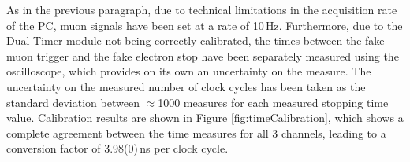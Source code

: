 \documentclass[../main.tex]{subfiles}
\begin{document}
As in the previous paragraph, due to technical limitations in the acquisition rate of the PC, muon signals have been set at a rate of 10\,Hz. Furthermore, due to the Dual Timer module not being correctly calibrated, the times between the fake muon trigger and the fake electron stop have been separately measured using the oscilloscope, which provides on its own an uncertainty on the measure. The uncertainty on the measured number of clock cycles has been taken as the standard deviation between $\approx$1000 measures for each measured stopping time value. Calibration results are shown in Figure \ref{fig:timeCalibration}, which shows a complete agreement between the time measures for all 3 channels, leading to a conversion factor of 3.98(0)\,ns per clock cycle.

\begin{figure}[htb!]%
 \centering
 \\%
 \\

\end{figure}
\end{document}
